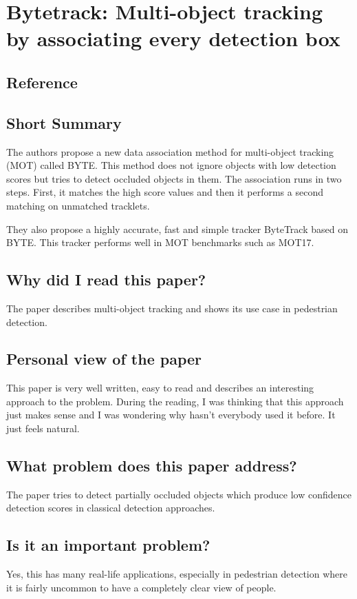 \documentclass[11pt,a4paper]{article}
\begin{document}
\section*{Bytetrack: Multi-object tracking by associating every detection box}
\subsection*{Reference}

\subsection*{Short Summary} 
The authors propose a new data association method for multi-object tracking (MOT) called BYTE. This method does not ignore objects with low detection scores but tries to detect occluded objects in them. The association runs in two steps. First, it matches the high score values and then it performs a second matching on unmatched tracklets.

They also propose a highly accurate, fast and simple tracker ByteTrack based on BYTE. This tracker performs well in MOT benchmarks such as MOT17.
\subsection*{Why did I read this paper?}
The paper describes multi-object tracking and shows its use case in pedestrian detection.
\subsection*{Personal view of the paper}
This paper is very well written, easy to read and describes an interesting approach to the problem. During the reading, I was thinking that this approach just makes sense and I was wondering why hasn’t everybody used it before. It just feels natural.
\subsection*{What problem does this paper address?}
The paper tries to detect partially occluded objects which produce low confidence detection scores in classical detection approaches.
\subsection*{Is it an important problem?}
Yes, this has many real-life applications, especially in pedestrian detection where it is fairly uncommon to have a completely clear view of people.
\end{document}
